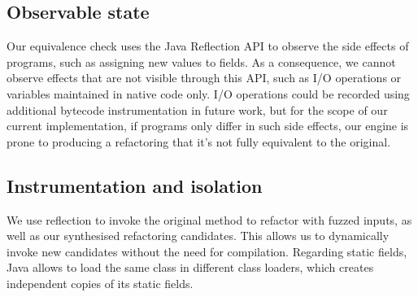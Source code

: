 \documentclass[conference]{IEEEtran}
\begin{document}
%


\subsection{Observable state}\label{sec:observable}

Our equivalence check uses the Java Reflection API to observe the side effects
of programs, such as assigning new values to fields. As a consequence, we cannot
observe effects that are not visible through this API, such as I/O operations or
variables maintained in native code only. I/O operations could be recorded using
additional bytecode instrumentation in future work, but for the scope of our current
implementation, if programs only differ in such %
side effects, our engine is prone to producing a refactoring that it's not fully equivalent to the original.



  
\subsection{Instrumentation and isolation}

We use reflection to invoke the original method to refactor with fuzzed inputs,
as well as our synthesised refactoring candidates. This allows us to dynamically
invoke new candidates without the need for compilation.
Regarding static fields, Java
allows to load the same class in different class loaders, which creates
independent copies of its static fields.
\end{document}
